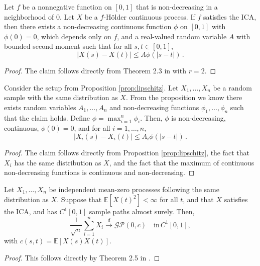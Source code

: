 \begin{proposition}\label{prop:lipschitz}
    Let $f$ be a nonnegative function on $[0, 1]$ that is non-decreasing in a
    neighborhood of $0$. Let $X$ be a $f$-H\"older continuous process. If $f$ satisfies
    the ICA, then there exists a non-decreasing continuous function $\phi$ on $[0, 1]$
    with $\phi(0) = 0$, which depends only on $f$, and a real-valued random variable $A$
    with bounded second moment such that for all $s, t \in [0, 1]$,
    \[
        |X(s) - X(t)| \leq A \phi(|s - t|) \,.
    \]
\end{proposition}
\begin{proof}
    The claim follows directly from Theorem 2.3 in \cite{hahn1977} with $r = 2$.
\end{proof}

\begin{corollary}\label{cor:lipschitz}
    Consider the setup from Proposition \ref{prop:lipschitz}. Let $X_1, \dots, X_n$ be
    a random sample with the same distribution as $X$. From the proposition we know
    there exists random variables $A_1, \dots, A_n$ and non-decreasing functions
    $\phi_1, \dots, \phi_n$ such that the claim holds. Define $\phi = \max_{i = 1}^n
    \phi_i$. Then, $\phi$ is non-decreasing, continuous, $\phi(0) = 0$, and for all $i =
    1, \dots, n$,
    \[
        |X_i(s) - X_i(t)| \leq A_i \phi(|s - t|) \,.
    \]
\end{corollary}
\begin{proof}
    The claim follows directly from Proposition \ref{prop:lipschitz}, the fact that
    $X_i$ has the same distribution as $X$, and the fact that the maximum of continuous
    non-decreasing functions is continuous and non-decreasing.
\end{proof}


\begin{theorem}\label{thm:fclt}
    Let $X_1, \dots, X_n$ be independent mean-zero processes following the same
    distribution as $X$. Suppose that $\mathbb{E}[X(t)^2] < \infty$ for all $t$, and
    that $X$ satisfies the ICA, and has $C^1[0, 1]$ sample paths almost surely. Then,
    \[
        \frac{1}{\sqrt{n}} \sum_{i = 1}^n X_i \overset{d}{\to} \mathcal{GP}(0, c)
        \quad \text{in} \, C^1[0, 1],
    \]
    with $c(s, t) = \mathbb{E}[X(s) X(t)]$.
\end{theorem}
\begin{proof}
    This follows directly by Theorem 2.5 in \cite{hahn1977}.
\end{proof}



